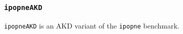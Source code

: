 \subsubsection{\tt ipopneAKD}
\label{benchmarkipopneAKD}

{\tt ipopneAKD} is an AKD variant of the {\tt ipopne} benchmark.
